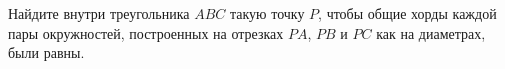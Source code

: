 \begin{ex}
	\begin{condition}
		Найдите внутри треугольника \( ABC  \) такую точку \( P  \), чтобы общие хорды каждой пары окружностей, построенных на отрезках \( PA \), \( PB  \) и \( PC  \) как на диаметрах, были равны.
	\end{condition}
\end{ex}